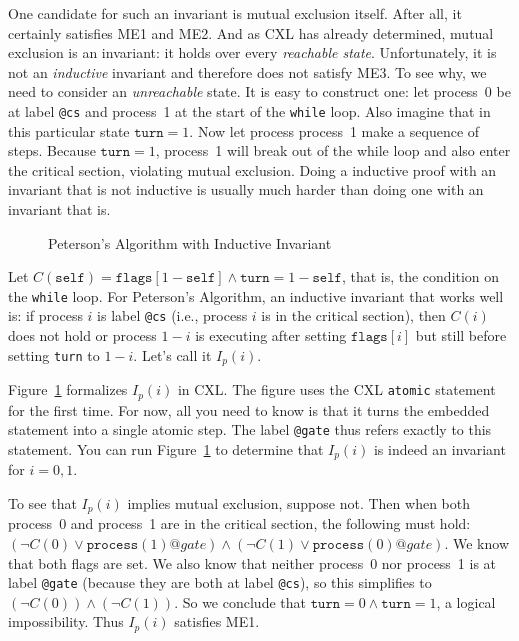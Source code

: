 \documentclass{report}
\newenvironment{code}{
\tcolorbox
}{
\endtcolorbox
}
\begin{document}
One candidate for such an invariant is mutual exclusion itself.
After all, it certainly satisfies ME1 and ME2.
And as CXL has already determined, mutual exclusion is an invariant:
it holds over every \emph{reachable state}.
Unfortunately, it is not an \emph{inductive} invariant and therefore does
not satisfy ME3.
To see why, we need to consider an \emph{unreachable} state.
It is easy to construct one: let process~0 be at label \texttt{@cs}
and process~1 at the start of the \texttt{while} loop.
Also imagine that in this particular state $\mathtt{turn} = 1$.  Now let
process process~1 make a sequence of steps.  Because $\mathtt{turn} = 1$,
process~1 will break out of the while loop and also enter the critical
section, violating mutual exclusion.
Doing a inductive proof with an invariant that is not inductive is usually
much harder than doing one with an invariant that is.

\begin{figure}
\begin{code}

\end{code}
\caption{Peterson's Algorithm with Inductive Invariant}
\label{fig:petersonproof}
\end{figure}

Let $C(\mathtt{self}) = \mathtt{flags}[1 - \mathtt{self}] \land
\mathtt{turn} = 1 - \mathtt{self}$, that is, the condition on the \texttt{while} loop.
For Peterson's Algorithm, an inductive invariant that works well is:
if process $i$ is label \texttt{@cs} (i.e., process $i$ is in the critical section),
then $C(i)$ does not hold or process $1-i$ is executing after setting
$\mathtt{flags}[i]$ but still before setting \texttt{turn} to $1-i$.
Let's call it $I_p(i)$.

Figure~\ref{fig:petersonproof} formalizes $I_p(i)$ in CXL.
The figure uses the CXL \texttt{atomic} statement for the first time.
For now, all you need to know is that it turns the embedded statement into
a single atomic step.  The label \texttt{@gate} thus refers exactly to
this statement.  You can run Figure~\ref{fig:petersonproof} to determine
that $I_p(i)$ is indeed an invariant for $i = 0, 1$.

To see that $I_p(i)$ implies mutual exclusion, suppose not.  Then
when both process~0 and process~1 are in the critical section, the
following must hold:
$(\lnot C(0) \lor \mathtt{process}(1)@gate) \land
 (\lnot C(1) \lor \mathtt{process}(0)@gate)$.
We know that both flags are set.
We also know that neither process~0 nor process~1 is at label \texttt{@gate}
(because they are both at label \texttt{@cs}),
so this simplifies to $(\lnot C(0)) \land (\lnot C(1))$.
So we conclude that $\mathtt{turn} = 0 \land \mathtt{turn} = 1$, a
logical impossibility.  Thus $I_p(i)$ satisfies ME1.
\end{document}
